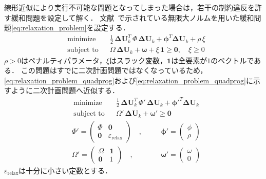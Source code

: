 \documentclass[autodetect-engine,dvipdfmx-if-dvi,ja=standard,a4j,jbase=11pt,magstyle=nomag*]{bxjsreport}
\begin{document}
\label{緩和問題と求解方法}
線形近似により実行不可能な問題となってしまった場合は，若干の制約違反を許す緩和問題を設定して解く．
文献~\cite{maciejowski_2005jp}で示されている無限大ノルムを用いた緩和問題\cref{eq:relaxation_problem}を設定する．
\begin{equation}
    \label{eq:relaxation_problem}
    \begin{aligned}
        & \text{minimize} && \frac{1}{2} \, \bm{\Delta U}_k^T \, \varPhi \, \bm{\Delta U}_k + \bm{\phi}^T \bm{\Delta U}_k + \rho \, \xi  \\
        & \text{subject~to} && \varOmega \, \bm{\Delta U}_k + \bm{\omega} + \xi \, \bm{1} \geq \bm{0} ,\quad \xi \geq 0
    \end{aligned}
\end{equation}
$\rho > 0$はペナルティパラメータ，$\xi$はスラック変数，$\bm{1}$は全要素が$1$のベクトルである．
この問題はすでに二次計画問題ではなくなっているため，\cref{eq:relaxation_problem_quadprog}および\cref{eq:relaxation_problem_quadprog}に示すように二次計画問題へ近似する．
\begin{equation}
    \label{eq:relaxation_problem_quadprog}
    \begin{aligned}
        & \text{minimize} && \frac{1}{2} \, \bm{\Delta U}_k^T \, \varPhi' \, \bm{\Delta U}_k + \bm{\phi'}^T \bm{\Delta U}_k \\
        & \text{subject~to} && \varOmega' \, \bm{\Delta U}_k + \bm{\omega'} \geq \bm{0}
    \end{aligned}
\end{equation}
\begin{equation}
    \label{eq:relaxation_problem_quadprog_coeff}
    \begin{aligned}
        & \varPhi' = 
            \begin{pmatrix}
                \varPhi & \bm{0} \\
                \bm{0} & \varepsilon_{\mathrm{relax}}
            \end{pmatrix} 
        \quad , \quad
        && \bm{\phi}'  = 
            \begin{pmatrix}
                \phi \\
                \rho
            \end{pmatrix}
        \\
        & \varOmega' = 
            \begin{pmatrix}
                \Omega & \bm{1} \\
                \bm{0} & 1
            \end{pmatrix} 
        \quad , \quad
        && \bm{\omega}' = 
            \begin{pmatrix}
                \omega \\
                0
            \end{pmatrix} 
    \end{aligned}
\end{equation}
$\varepsilon_{\mathrm{relax}}$は十分に小さい定数とする．
\end{document}
